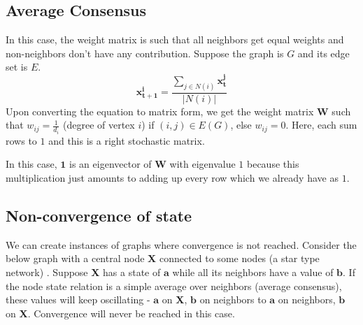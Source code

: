 \documentclass[12pt]{article}
\begin{document}
\subsection{Average Consensus}
In this case, the weight matrix is such that all neighbors get equal weights and non-neighbors don't have any contribution. Suppose the graph is $G$ and its edge set is $E$.
\[\mathbf{x_{t+1}^i} = \frac{\sum_{j\in N(i)} \mathbf{x_{t}^j}}{|N(i)|}\]
Upon converting the equation to matrix form, we get the weight matrix $\mathbf{W}$ such that $w_{ij}=\frac{1}{d_i}$ (degree of vertex $i$) if $(i,j)\in E(G)$, else $w_{ij}=0$. Here, each sum rows to $1$ and this is a right stochastic matrix.

In this case, $\mathbf{1}$ is an eigenvector of $\mathbf{W}$ with eigenvalue $1$ because this multiplication just amounts to adding up every row which we already have as $1$.
\subsection{Non-convergence of state}
We can create instances of graphs where convergence is not reached. Consider the below graph with a central node \textbf{X} connected to some nodes (a star type network) . Suppose \textbf{X} has a state of $\mathbf{a}$ while all its neighbors have a value of $\mathbf{b}$. If the node state relation is a simple average over neighbors (average consensus), these values will keep oscillating - $\mathbf{a}$ on \textbf{X}, $\mathbf{b}$ on neighbors to $\mathbf{a}$ on neighbors, $\mathbf{b}$ on \textbf{X}. Convergence will never be reached in this case.
\end{document}
